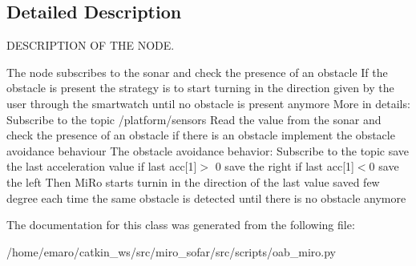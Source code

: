 \subsection{Detailed Description}
D\+E\+S\+C\+R\+I\+P\+T\+I\+ON OF T\+HE N\+O\+DE. 

The node subscribes to the sonar and check the presence of an obstacle If the obstacle is present the strategy is to start turning in the direction given by the user through the smartwatch until no obstacle is present anymore More in details\+: Subscribe to the topic /platform/sensors Read the value from the sonar and check the presence of an obstacle if there is an obstacle implement the obstacle avoidance behaviour The obstacle avoidance behavior\+: Subscribe to the topic  save the last acceleration value if last acc\mbox{[}1\mbox{]}$>$ 0 save the right if last acc\mbox{[}1\mbox{]}$<$0 save the left Then Mi\+Ro starts turnin in the direction of the last value saved few degree each time the same obstacle is detected until there is no obstacle anymore 

The documentation for this class was generated from the following file\+:\begin{DoxyCompactItemize}
\item 
/home/emaro/catkin\+\_\+ws/src/miro\+\_\+sofar/src/scripts/oab\+\_\+miro.\+py\end{DoxyCompactItemize}
